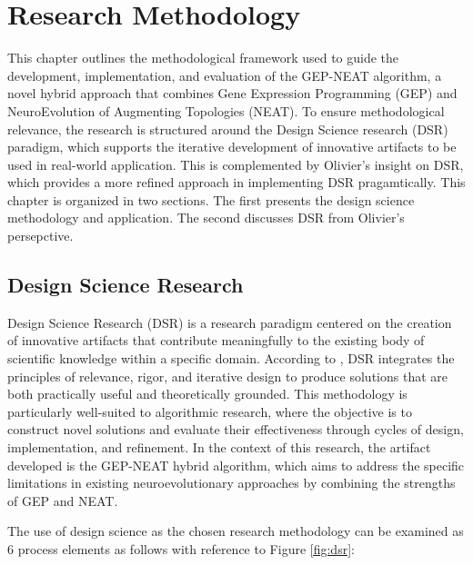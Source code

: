 \chapter{Research Methodology}
This chapter outlines the methodological framework used to guide the development, implementation, and evaluation of the GEP-NEAT algorithm, a novel hybrid approach that combines Gene Expression Programming (GEP) and NeuroEvolution of Augmenting Topologies (NEAT). To ensure methodological relevance, the research is structured around the Design Science research (DSR) paradigm, which supports the iterative development of innovative artifacts to be used in real-world application. This is complemented by Olivier's insight on DSR, which provides a more refined approach in implementing DSR pragamtically. This chapter is organized in two sections. The first presents the design science methodology and application. The second discusses DSR from Olivier's persepctive.

\section{Design Science Research}
Design Science Research (DSR) is a research paradigm centered on the creation of innovative artifacts that contribute meaningfully to the existing body of scientific knowledge within a specific domain. According to \cite{hevner2004design}, DSR integrates the principles of relevance, rigor, and iterative design to produce solutions that are both practically useful and theoretically grounded. This methodology is particularly well-suited to algorithmic research, where the objective is to construct novel solutions and evaluate their effectiveness through cycles of design, implementation, and refinement. In the context of this research, the artifact developed is the GEP-NEAT hybrid algorithm, which aims to address the specific limitations in existing neuroevolutionary approaches by combining the strengths of GEP and NEAT.

\parbreak

\noindent The use of design science as the chosen research methodology can be examined as 6 process elements as follows with reference to Figure \ref{fig:dsr}:

